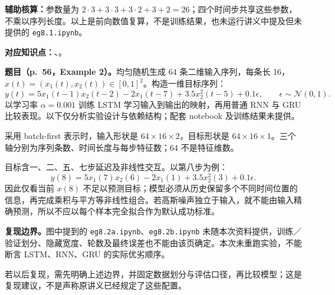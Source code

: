 \begin{workedsolution}
\textbf{辅助核算：}参数量为 $2\cdot3+3\cdot3+3\cdot2+3+2=26$；四个时间步共享这些参数，不乘以序列长度。以上是前向数值复算，不是训练结果，也未运行讲义中提及但未提供的 \texttt{eg8.1.ipynb}。
\end{workedsolution}


\textbf{对应知识点：}、。

\textbf{题目（p.~56，Example 2）。}均匀随机生成 64 条二维输入序列，每条长 16，$x(t)=(x_1(t),x_2(t))\in[0,1]^2$。构造一维目标序列：
\[
 y(t)=5x_1(t-1)x_2(t-2)-2x_1(t-7)
      +3.5x_2^2(t-5)+0.1\epsilon,
 \qquad\epsilon\sim\mathcal N(0,1).
\]
以学习率 $\alpha=0.001$ 训练 LSTM 学习输入到输出的映射，再用普通 RNN 与 GRU 比较表现。以下仅分析实验设计与依赖结构；配套 notebook 及训练结果未提供。

\begin{workedsolution}
采用 batch-first 表示时，输入形状是 $64\times16\times2$，目标形状是 $64\times16\times1$。三个轴分别为序列条数、时间长度与每步特征数；64 不是特征维数。

目标含一、二、五、七步延迟及非线性交互。以第八步为例：
\[
 y(8)=5x_1(7)x_2(6)-2x_1(1)+3.5x_2^2(3)+0.1\epsilon.
\]
因此仅看当前 $x(8)$ 不足以预测目标；模型必须从历史保留多个不同时间位置的信息，再完成乘积与平方等非线性组合。若高斯噪声独立于输入，就不能由输入精确预测，所以不应以每个样本完全拟合作为默认成功标准。

\textbf{复现边界。}图中提到的 \texttt{eg8.2a.ipynb}、\texttt{eg8.2b.ipynb} 未随本次资料提供，训练／验证划分、隐藏宽度、轮数及最终误差也不能由该页确定。本次未重跑实验，不能断言 LSTM、RNN、GRU 的实际优劣顺序。

若以后复现，需先明确上述边界，并固定数据划分与评估口径，再比较模型；这是复现建议，不是声称原讲义已经规定了这些配置。
\end{workedsolution}
